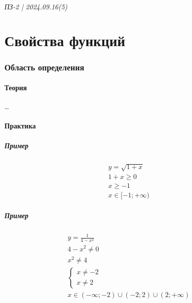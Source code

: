 \documentclass{article}
\begin{document}
\newpage
\paragraph{ПЗ-2 | 2024.09.16(5)}
\part{Свойства функций}

\section{Область определения}

\subsection{Теория}
\dots


\subsection{Практика}
\subsubsection{Пример}
\begin{gather*}
    y = \sqrt{1 + x} \\
    1 + x \ge 0 \\
    x \ge -1 \\
    x \in [-1; +\infty)
\end{gather*}

\subsubsection{Пример}
\begin{gather*}
    y = \frac{1}{4 - x^2} \\
    4 - x^2 \neq 0 \\
    x^2 \neq 4 \\
    \begin{cases}
        x \neq -2 \\
        x \neq 2
    \end{cases} \\
    x \in (-\infty; -2) \cup (-2; 2) \cup (2; +\infty)
\end{gather*}
\end{document}
